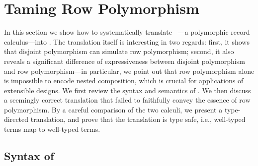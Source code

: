 \renewcommand{\rulehl}[2][gray!40]{%
  \colorbox{#1}{$\displaystyle#2$}}


\section{Taming Row Polymorphism}

In this section we show how to systematically translate
\rname~\cite{Harper:1991:RCB:99583.99603}---a polymorphic record calculus---into
\fnamee. The translation itself is interesting in two regards: first, it shows
that disjoint polymorphism can simulate row polymorphism; second, it also
reveals a significant difference of expressiveness between disjoint polymorphism
and row polymorphism---in particular, we point out that row polymorphism alone
is impossible to encode nested composition, which is crucial for applications of
extensible designs. We first review the syntax and semantics of
\rname. We then discuss a seemingly correct translation that failed to
faithfully convey the essence of row polymorphism. By a careful comparison of
the two calculi, we present a type-directed translation,
and prove that the translation is type safe, i.e., well-typed \rname terms map
to well-typed \fnamee terms.



\subsection{Syntax of \rname}

